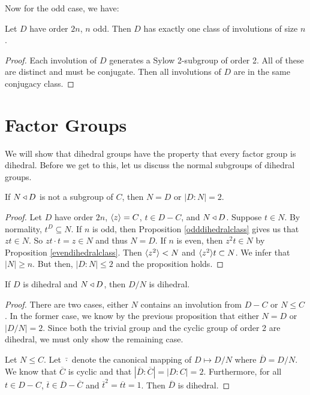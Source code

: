 \documentclass[main.tex]{subfiles}
\begin{document}
Now for the odd case, we have:

\begin{proposition}\label{odddihedralclass}
Let $D$ have order $2n$, $n$ odd. Then $D$ has exactly one class of involutions of size $n$.
\end{proposition}

\begin{proof}
Each involution of $D$ generates a Sylow 2-subgroup of order 2. All of these are distinct and must be conjugate. Then all involutions of $D$ are in the same conjugacy class.
\end{proof}

\hss

\section{Factor Groups}

\hss

We will show that dihedral groups have the property that every factor group is dihedral. Before we get to this, let us discuss the normal subgroups of dihedral groups.

\begin{proposition}
If $N \triangleleft D$ is not a subgroup of $C$, then $N = D$ or $|D : N| = 2$.
\end{proposition}

\begin{proof}
Let $D$ have order $2n$, $\langle z \rangle = C$, $t \in D - C$, and $N \triangleleft D$. Suppose $t \in N$. By normality, $t^D \subseteq N$. If $n$ is odd, then Proposition \ref{odddihedralclass} gives us that $z t \in N$. So $z t \cdot t = z \in N$ and thus $N = D$. If $n$ is even, then $z^2 t \in N$ by Proposition \ref{evendihedralclass}. Then $\langle z^2 \rangle < N$ and $\langle z^2 \rangle t \subset N$. We infer that $|N| \ge n$. But then, $|D : N| \le 2$ and the proposition holds.
\end{proof}

\begin{proposition}
If $D$ is dihedral and $N \triangleleft D$, then $D/N$ is dihedral.
\end{proposition}

\begin{proof}
There are two cases, either $N$ contains an involution from $D - C$  or $N \le C$. In the former case, we know by the previous proposition that either $N = D$ or $|D/N| = 2$. Since both the trivial group and the cyclic group of order 2 are dihedral, we must only show the remaining case.

Let $N \le C$. Let $\bar{ \cdot }$ denote the canonical mapping of $D \mapsto D/N$ where $\overline{D} = D/N$. We know that $\overline{C}$ is cyclic and that $|\overline{D} : \overline{C}| = |D : C| = 2$. Furthermore, for all $t \in D - C$, $\overline{t} \in \overline{D} - \overline{C}$ and $\overline{t}^2 = \overline{tt} = 1$. Then $\overline{D}$ is dihedral.

\end{proof}
\end{document}

